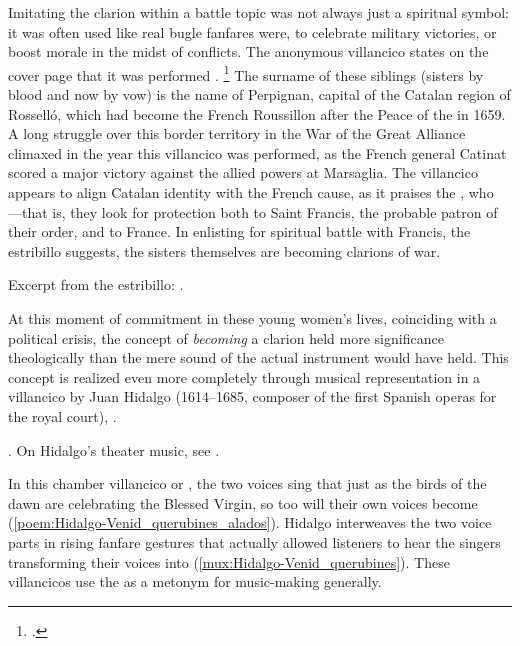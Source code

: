 Imitating the clarion within a battle topic was not always just a spiritual
symbol: it was often used like real bugle fanfares were, to celebrate military
victories, or boost morale in the midst of conflicts.
The anonymous villancico  states on the cover
page that it was performed .%
    \footnote{.}
The surname of these siblings (sisters by blood and now by vow) is the name of
Perpignan, capital of the Catalan region of Rosselló, which had become the
French Roussillon after the Peace of the \XXX[Pyrennees] in 1659.
A long struggle over this border territory in the War of the Great Alliance
climaxed in the year this villancico was performed, as the French general
Catinat scored a major victory against the allied powers at Marsaglia.%
    \citXXX[history]
The villancico appears to align Catalan identity with the French cause, as it
praises the , who
---that is,
they look for protection both to Saint Francis, the probable patron of their
order, and to France.
In enlisting for spiritual battle with Francis, the estribillo suggests, the
sisters themselves are becoming clarions of war.%
\begin{Footnote}
    Excerpt from the estribillo: 
    .
\end{Footnote}

At this moment of commitment in these young women's lives, coinciding with a
political crisis, the concept of \emph{becoming} a clarion held more
significance theologically than the mere sound of the actual instrument would
have held.
This concept is realized even more completely through musical representation in
a villancico by Juan Hidalgo (1614--1685, composer of the first Spanish operas
for the royal court), .%
\begin{Footnote}
    . 
    On Hidalgo's theater music, see \citXXX[Stein].
\end{Footnote}
In this chamber villancico or , the two voices sing that just
as the birds of the dawn are  celebrating the Blessed Virgin, so
too will their own voices become 
(\cref{poem:Hidalgo-Venid_querubines_alados}).
Hidalgo interweaves the two voice parts in rising fanfare gestures that
actually allowed listeners to hear the singers transforming their voices into
 (\cref{mux:Hidalgo-Venid_querubines}).
These villancicos use the  as a metonym for music-making
generally.

